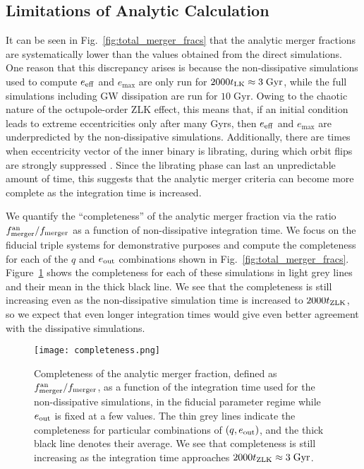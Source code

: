 \documentclass[
        fleqn,
        usenatbib,
    ]{mnras}
\begin{document}
\subsection{Limitations of Analytic Calculation}\label{ss:completeness}

It can be seen in Fig.~\ref{fig:total_merger_fracs} that the analytic
merger fractions are systematically lower than the values obtained from the
direct simulations. One reason that this discrepancy arises is because the
non-dissipative simulations used to compute $e_{\rm eff}$ and $e_{\max}$ are
only run for $2000 t_{\rm LK} \approx 3\;\mathrm{Gyr}$, while the full
simulations including GW dissipation are run for $10\;\mathrm{Gyr}$. Owing to
the chaotic nature of the octupole-order ZLK effect, this means that, if an
initial condition leads to extreme eccentricities only after many Gyrs, then
$e_{\rm eff}$ and $e_{\max}$ are underpredicted by the non-dissipative
simulations. Additionally, there are times when eccentricity vector of the inner
binary is librating, during which orbit flips are strongly suppressed
\citep{katz2011long}. Since the librating phase can last an unpredictable amount
of time, this suggests that the analytic merger criteria can become more
complete as the integration time is increased.

We quantify the ``completeness'' of the analytic merger fraction via the ratio
$f_{\rm merger}^{\rm an} / f_{\rm merger}$ as a function of non-dissipative
integration time. We focus on the fiducial triple systems for
demonstrative purposes and compute the completeness for each of the $q$ and
$e_{\rm out}$ combinations shown in Fig.~\ref{fig:total_merger_fracs}.
Figure~\ref{fig:completeness} shows the completeness for each of these
simulations in light grey lines and their mean in the thick black line. We see
that the completeness is still increasing even as the non-dissipative simulation
time is increased to $2000t_{\rm ZLK}$, so we expect that even longer
integration times would give even better agreement with the dissipative
simulations.
\begin{figure}
    \centering
    \texttt{[image: completeness.png]}
    \caption{Completeness of the analytic merger fraction, defined as
    $f_{\rm merger}^{\rm an} / f_{\rm merger}$, as a function of the integration time
    used for the non-dissipative simulations, in the fiducial
    parameter regime while $e_{\rm out}$ is fixed at a few values. The thin grey
    lines indicate the completeness for particular combinations of $(q, e_{\rm
    out})$, and the thick black line denotes their average. We see that
    completeness is still increasing as the integration time approaches $2000
    t_{\rm ZLK} \approx 3\;\mathrm{Gyr}$. }\label{fig:completeness}
\end{figure}
\end{document}
